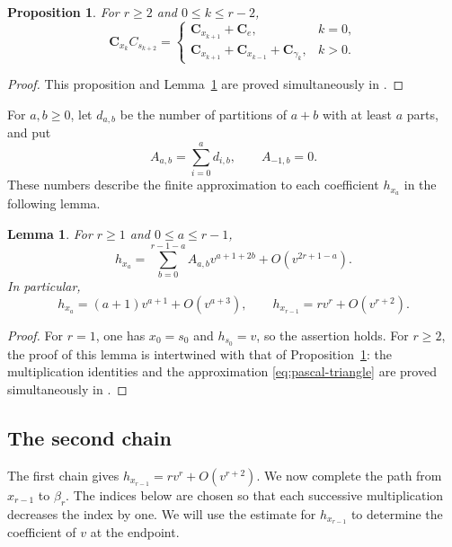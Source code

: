\documentclass[11pt,a4paper,reqno]{amsart}
\numberwithin{equation}{section}
\newtheorem{proposition}[theorem]{Proposition}
\newtheorem{lemma}[theorem]{Lemma}
\theoremstyle{definition}
\theoremstyle{remark}
\theoremstyle{plain}
\newcommand{\C}{\mathbf C}
\begin{document}
{\color{black}
\begin{proposition}\label{prop:first-multiplication}
For $r\geq2$ and $0\leq k\leq r-2$,
\begin{equation}\label{eq:first-multiplication}
 \C_{x_k}C_{s_{k+2}}
 =
 \begin{cases}
  \C_{x_{k+1}}+\C_e,&k=0,\\
  \C_{x_{k+1}}+\C_{x_{k-1}}+\C_{\gamma_k},&k>0.
 \end{cases}
\end{equation}
\end{proposition}
\begin{proof}
This proposition and Lemma~\ref{lem:scalar-comparison} are proved
simultaneously in .
\end{proof}
}


For $a,b\geq0$, let $d_{a,b}$ be the number of partitions of $a+b$
with at least $a$ parts, and put
\begin{equation}\label{eq:A-definition}
 A_{a,b}=\sum_{i=0}^{a}d_{i,b},\qquad A_{-1,b}=0.
\end{equation}
These numbers describe the finite approximation to each coefficient
$h_{x_a}$ in the following lemma.

\begin{lemma}\label{lem:scalar-comparison}
For $r\geq1$ and $0\leq a\leq r-1$,
\begin{equation}\label{eq:pascal-triangle}
 h_{x_a}=\sum_{b=0}^{r-1-a}A_{a,b}v^{a+1+2b}
       +O(v^{2r+1-a}).
\end{equation}
In particular,
\[
 h_{x_a}=(a+1)v^{a+1}+O(v^{a+3}),\qquad
 h_{x_{r-1}}=rv^r+O(v^{r+2}).
\]
\end{lemma}
\begin{proof}
For $r=1$, one has $x_0=s_0$ and $h_{s_0}=v$, so the assertion
holds. For $r\geq2$, the proof of this lemma is intertwined with
that of Proposition~\ref{prop:first-multiplication}: the multiplication
identities and the approximation \eqref{eq:pascal-triangle} are proved
simultaneously in .
\end{proof}

\subsection{The second chain}\label{sec:second-chain}
The first chain gives $h_{x_{{r-1}}}=rv^r+O(v^{r+2})$. We now complete
the path from $x_{r-1}$ to $\beta_r$. The indices below are chosen so
that each successive multiplication decreases the index by one.
We will use the estimate for $h_{x_{{r-1}}}$ to determine the coefficient
of $v$ at the endpoint.
\end{document}
